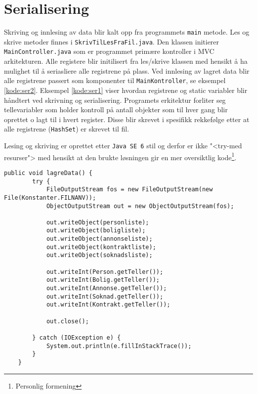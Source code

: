 \section{Serialisering} \label{sec:serialisering}
Skriving og innlesing av data blir kalt opp fra programmets \texttt{main} metode. Les og skrive metoder finnes i \texttt{SkrivTilLesFraFil.java}. Den klassen initierer \texttt{MainController.java} som er programmet primære kontroller i MVC arkitekturen. Alle registere blir initilisert fra les/skrive klassen med hensikt å ha mulighet til å seriasliere alle registrene på plass. Ved innlesing av lagret data blir alle registrene passert som komponenter til \texttt{MainKontroller}, se eksempel \ref{kode:ser2}. Eksempel \ref{kode:ser1} viser hvordan registrene og static variabler blir håndtert ved skrivning og serialisering. Programets erkitektur forliter seg tellevariabler som holder kontroll på antall objekter som til hver gang blir oprettet o lagt til i hvert register. Disse blir skrevet i spesifikk rekkefølge etter at alle registrene (\texttt{HashSet}) er skrevet til fil.

Lesing og skriving er oprettet etter \texttt{Java SE 6} stil og derfor er ikke "<try-med resurser"> med hensikt at den brukte løsningen gir en mer oversiktlig kode\footnote{Personlig formening}.


\begin{lstlisting}[caption=Serialisering og skriving av data.,label=kode:ser1]
    public void lagreData() {
        try {
            FileOutputStream fos = new FileOutputStream(new File(Konstanter.FILNANV));
            ObjectOutputStream out = new ObjectOutputStream(fos);

            out.writeObject(personliste);
            out.writeObject(boligliste);
            out.writeObject(annonseliste);
            out.writeObject(kontraktliste);
            out.writeObject(soknadsliste);

            out.writeInt(Person.getTeller());
            out.writeInt(Bolig.getTeller());
            out.writeInt(Annonse.getTeller());
            out.writeInt(Soknad.getTeller());
            out.writeInt(Kontrakt.getTeller());

            out.close();

        } catch (IOException e) {
            System.out.println(e.fillInStackTrace());
        }
    }
\end{lstlisting}

